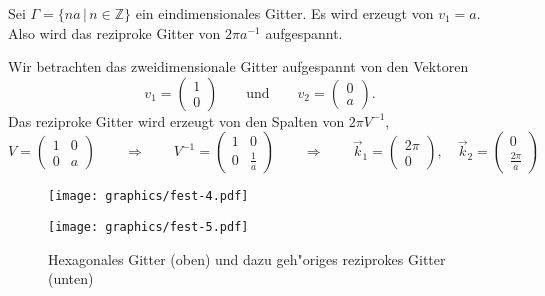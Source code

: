\begin{beispiel}
Sei $\Gamma = \{ na\,|\, n\in\mathbb Z\}$ ein eindimensionales Gitter.
Es wird erzeugt von $v_1=a$.
Also wird das reziproke Gitter von $2\pi a^{-1}$ aufgespannt.
\end{beispiel}

\begin{beispiel}
Wir betrachten das zweidimensionale Gitter aufgespannt von den Vektoren
\[
v_1=\begin{pmatrix}1\\0\end{pmatrix}
\qquad\text{und}\qquad
v_2=\begin{pmatrix}0\\a\end{pmatrix}.
\]
Das reziproke Gitter wird erzeugt von den Spalten von $2\pi V^{-1}$,
\[
V=\begin{pmatrix} 1&0\\ 0&a \end{pmatrix}
\qquad\Rightarrow\qquad
V^{-1}=\begin{pmatrix}1&0\\0&\frac1a\end{pmatrix}
\qquad\Rightarrow\qquad
\vec k_1=\begin{pmatrix}2\pi\\0\end{pmatrix},\quad
\vec k_2=\begin{pmatrix}0\\\frac{2\pi}a\end{pmatrix}
\]
\end{beispiel}

\begin{figure}
\centering
\texttt{[image: graphics/fest-4.pdf]}
\bigskip

\texttt{[image: graphics/fest-5.pdf]}
\caption{Hexagonales Gitter (oben) und dazu geh"origes reziprokes Gitter
(unten)
\label{skript:hexaonalesgitter}}
\end{figure}

